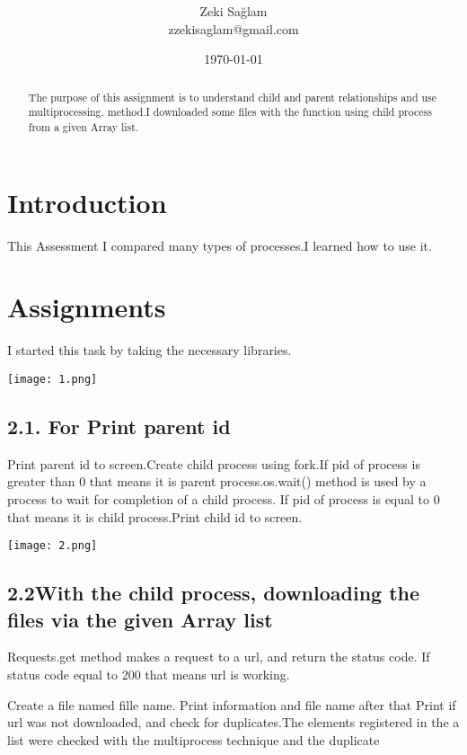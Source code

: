 \documentclass[onecolumn]{article}
\title{\spacecaps{Assignment Report 2: Multiprocess Implementation}\\ \normalsize \spacesc{CENG2034, Operating Systems} }
\author{Zeki Sağlam\\zzekisaglam@gmail.com}
\date{\today}
\begin{document}
\maketitle

\begin{abstract}
The purpose of this assignment is to understand child and parent relationships and use multiprocessing.
method.I downloaded
some files with the function using child process from a given Array list.
\end{abstract}


\section{Introduction}
This Assessment I compared many types of processes.I learned how to use it. 

\section{Assignments}
I started this task by taking the necessary libraries.


\texttt{[image: 1.png]}



\subsection*{2.1. For Print parent id }

Print parent id to screen.Create child process using fork.If pid of process is greater than 0 that means it is parent process.os.wait() method is used by a process to wait for completion of a child process.
If pid of process is equal to 0 that means it is child process.Print child id to screen.


\texttt{[image: 2.png]}

\subsection*{2.2With the child process, downloading the files via the given Array list}
Requests.get method makes a request to a url, and return the status code. If status code equal to 200 that means url is working. 

 Create a file named fille name. 
 Print information and file name after that Print if url was not downloaded, and check for duplicates.The elements registered in the a list were checked with the multiprocess technique and the duplicate
  
\end{document}
